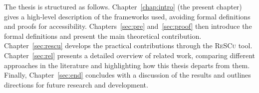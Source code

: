 The thesis is structured as follows. 
Chapter~\ref{chap:intro} (the present chapter) gives a high-level 
description of the frameworks used, avoiding formal definitions and 
proofs for accessibility. Chapters~\ref{sec:pre} and~\ref{sec:proof} 
then introduce the formal definitions and present the main theoretical 
contribution. Chapter~\ref{sec:rescu} develops the practical 
contributions through the \textsc{ReSCu} tool. 
Chapter~\ref{sec:rel} presents 
a detailed overview of related work, comparing different approaches in 
the literature and highlighting how this thesis departs from them. Finally, 
Chapter~\ref{sec:end} concludes with a discussion of the results and 
outlines directions for future research and development.

